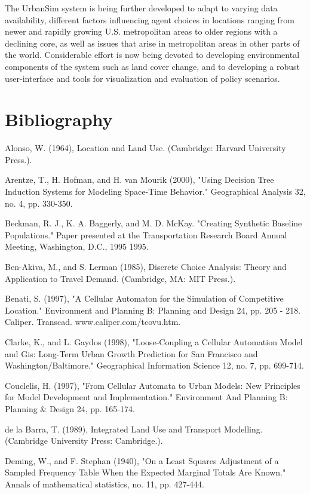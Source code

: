 The UrbanSim system is being further developed to adapt to varying data availability, different factors influencing agent choices in locations ranging from newer and rapidly growing U.S. metropolitan areas to older regions with a declining core, as well as issues that arise in metropolitan areas in other parts of the world.  Considerable effort is now being devoted to developing environmental components of the system such as land cover change, and to developing a robust user-interface and tools for visualization and evaluation of policy scenarios.


\section{Bibliography}

Alonso, W. (1964), Location and Land Use. (Cambridge: Harvard University Press.).

Arentze, T., H. Hofman, and H. van Mourik (2000), "Using Decision Tree Induction Systems for Modeling Space-Time Behavior." Geographical Analysis 32, no. 4, pp. 330-350.

Beckman, R. J., K. A. Baggerly, and M. D. McKay. "Creating Synthetic Baseline Populations." Paper presented at the Transportation Research Board Annual Meeting, Washington, D.C., 1995 1995.

Ben-Akiva, M., and S. Lerman (1985), Discrete Choice Analysis: Theory and Application to Travel Demand. (Cambridge, MA: MIT Press.).

Benati, S. (1997), "A Cellular Automaton for the Simulation of Competitive Location." Environment and Planning B: Planning and Design 24, pp. 205 - 218.
Caliper. Transcad. www.caliper.com/tcovu.htm.

Clarke, K., and L. Gaydos (1998), "Loose-Coupling a Cellular Automation Model and Gis: Long-Term Urban Growth Prediction for San Francisco and Washington/Baltimore." Geographical Information Science 12, no. 7, pp. 699-714.

Couclelis, H. (1997), "From Cellular Automata to Urban Models: New Principles for Model Development and Implementation." Environment And Planning B: Planning \& Design 24, pp. 165-174.

de la Barra, T. (1989), Integrated Land Use and Transport Modelling. (Cambridge University Press: Cambridge.).

Deming, W., and F. Stephan (1940), "On a Least Squares Adjustment of a Sampled Frequency Table When the Expected Marginal Totals Are Known." Annals of mathematical statistics, no. 11, pp. 427-444.


